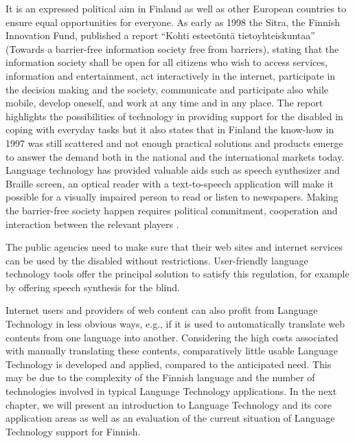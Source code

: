 \documentclass{../../metanetpaper}
\begin{document}
\begin{Parallel}[c]{79mm}{78mm}
{It is an expressed political aim in Finland as well as other European
countries to ensure equal opportunities for everyone. As early as 1998
the Sitra, the Finnish Innovation Fund, published a report “Kohti
esteetöntä tietoyhteiskuntaa” (Towards a barrier-free information
society free from barriers), stating that the information society
shall be open for all citizens who wish to access services, information
and entertainment, act interactively in the internet,
participate in the decision making and the society, communicate and
participate also while mobile, develop oneself, and work at any time
and in any place. The report highlights the possibilities of technology in
providing support for the disabled in coping with everyday tasks but
it also states that in Finland the know-how in 1997 was still
scattered and not enough practical solutions and products emerge to
answer the demand both in the national and the international
markets today. Language technology has provided valuable aids such as speech
synthesizer and Braille screen, an optical reader with a
text-to-speech application will make it possible for a visually
impaired person to read or listen to newspapers. Making the
barrier-free society happen requires political commitment, cooperation
and interaction between the relevant players \cite{Sitra1998}.

The public agencies need to make sure that their web sites and internet
services can be used by the disabled without restrictions. User-friendly
language technology tools offer the principal solution to satisfy this
regulation, for example by offering speech synthesis for the blind.

Internet users and providers of web content can also profit from
Language Technology in less obvious ways, e.g., if it is used to
automatically translate web contents from one language into
another. Considering the high costs associated with manually
translating these contents, comparatively little usable Language
Technology is developed and applied, compared to the anticipated
need. This may be due to the complexity of the Finnish language and
the number of technologies involved in typical Language Technology
applications. In the next chapter, we will present an introduction to
Language Technology and its core application areas as well as an
evaluation of the current situation of Language Technology support for
Finnish.
}

\ParallelPar



\end{Parallel}
\end{document}
